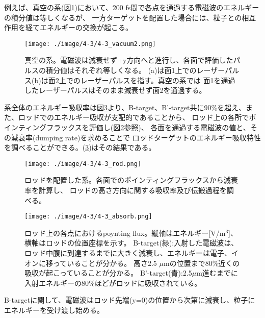 \documentclass[a4paper,11pt,titlepage]{jsarticle}
\begin{document}
    例えば、真空の系(図\ref{fig:4-3_vacuum2})において、200 fs間で各点を通過する電磁波のエネルギーの積分値は等しくなるが、
    一方ターゲットを配置した場合には、粒子との相互作用を経てエネルギーの交換が起こる。   
    \begin{figure}[H]
      \begin{center}
        \texttt{[image: ./image/4-3/4-3\_vacuum2.png]}
        \caption{
          \label{fig:4-3_vacuum2}
            真空の系。電磁波は減衰せず+y方向へと進行し、各面で評価したパルスの積分値はそれぞれ等しくなる。
            (a)は面1上でのレーザーパルス(b)は面2上でのレーザーパルスを指す。真空の系では
            面1を通過したレーザーパルスはそのまま減衰せず面2を通過する。
        }
      \end{center}
    \end{figure}
    系全体のエネルギー吸収率は図\ref{}より、B-target、B'-target共に90\%を超え、また、ロッドでのエネルギー吸収が支配的であることから、
    ロッド上の各所でポインティングフラックスを評価し(図\ref{fig:4-3_rod}参照)、
    各面を通過する電磁波の値と、その減衰率(dumping rate)を求めることで
    ロッドターゲットのエネルギー吸収特性を調べることができる。(\ref{})はその結果である。
    \begin{figure}[H]
      \begin{center}
        \texttt{[image: ./image/4-3/4-3\_rod.png]}
        \caption{
          \label{fig:4-3_rod}
            ロッドを配置した系。各面でのポインティングフラックスから減衰率を計算し、
            ロッドの高さ方向に関する吸収率及び伝搬過程を調べる。
        }
      \end{center}
    \end{figure}
    \begin{figure}[H]
      \begin{center}
        \texttt{[image: ./image/4-3/4-3\_absorb.png]}
        \label{}
        \caption{
            ロッド上の各点におけるpoynting flux。縦軸はエネルギー[V/m$^3$]、横軸はロッドの位置座標を示す。
            B-target(緑):入射した電磁波は、ロッド中腹に到達するまでに大きく減衰し、エネルギーは電子、イオンに移っていることが分かる。
            高さ2.5 $\mu$mの位置まで80\%近くの吸収が起こっていることが分かる。
            B'-target(青):2.5$\mu$m進むまでに入射エネルギーの80\%ほどがロッドに吸収されている。
        }
      \end{center}
    \end{figure}
    B-targetに関して、電磁波はロッド先端(y=0)の位置から次第に減衰し、粒子にエネルギーを受け渡し始める。
\end{document}
